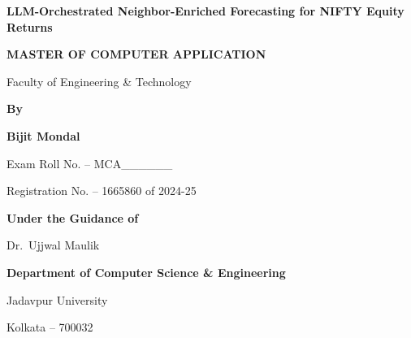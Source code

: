 \documentclass[12pt,a4paper,titlepage]{article}
\begin{document}
\begin{titlepage}
    \centering

    {\Huge\bfseries LLM-Orchestrated Neighbor-Enriched Forecasting for NIFTY Equity Returns\par}

    \vspace{2.2cm}
    {\Large\bfseries MASTER OF COMPUTER APPLICATION\par}
    \vspace{0.3cm}
    {\large Faculty of Engineering \& Technology\par}

    \vspace{1.8cm}
    {\large\bfseries By\par}
    \vspace{0.2cm}
    {\LARGE\bfseries Bijit Mondal\par}

    \vspace{1.2cm}
    {\large Exam Roll No. -- MCA\_\_\_\_\_\_\par}
    \vspace{0.2cm}
    {\large Registration No. -- 1665860 of 2024-25\par}

    \vfill
    {\large\bfseries Under the Guidance of\par}
    \vspace{0.3cm}
    {\Large Dr.\ Ujjwal Maulik\par}

    \vfill
    {\large\bfseries Department of Computer Science \& Engineering\par}
    \vspace{0.25cm}
    {\large Jadavpur University\par}
    \vspace{0.25cm}
    {\large Kolkata -- 700032\par}
\end{titlepage}
\end{document}
